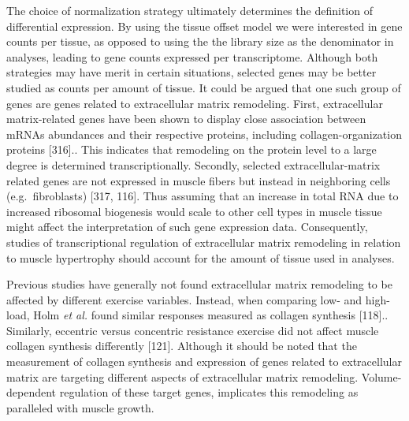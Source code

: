 \documentclass[twoside,10pt]{gihclass} %
\begin{document}
The choice of normalization strategy ultimately determines the definition of differential expression. By using the tissue offset model we were interested in gene counts per tissue, as opposed to using the the library size as the denominator in analyses, leading to gene counts expressed per transcriptome. Although both strategies may have merit in certain situations, selected genes may be better studied as counts per amount of tissue. It could be argued that one such group of genes are genes related to extracellular matrix remodeling.
First, extracellular matrix-related genes have been shown to display close association between mRNAs abundances and their respective proteins, including collagen-organization proteins {[}316{]}..
This indicates that remodeling on the protein level to a large degree is determined transcriptionally.
Secondly, selected extracellular-matrix related genes are not expressed in muscle fibers but instead in neighboring cells (e.g.~fibroblasts)
{[}317, 116{]}.
Thus assuming that an increase in total RNA due to increased ribosomal biogenesis would scale to other cell types in muscle tissue might affect the interpretation of such gene expression data.
Consequently, studies of transcriptional regulation of extracellular matrix remodeling in relation to muscle hypertrophy should account for the amount of tissue used in analyses.

Previous studies have generally not found extracellular matrix remodeling to be affected by different exercise variables. Instead, when comparing low- and high-load, Holm \emph{et al.} found similar responses measured as collagen synthesis {[}118{]}..
Similarly, eccentric versus concentric resistance exercise did not affect muscle collagen synthesis differently
{[}121{]}.
Although it should be noted that the measurement of collagen synthesis and expression of genes related to extracellular matrix are targeting different aspects of extracellular matrix remodeling. Volume-dependent regulation of these target genes, implicates this remodeling as paralleled with muscle growth.
\end{document}
